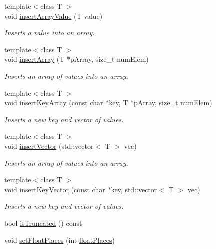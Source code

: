 \begin{DoxyCompactItemize}
{\footnotesize template$<$class T $>$ }\\void \hyperlink{class_json_writer_a8b4dc6726b66b4f277c7674e60c8a057}{insert\+Array\+Value} (T value)
\begin{DoxyCompactList}\small\item\em Inserts a value into an array. \end{DoxyCompactList}\item 
{\footnotesize template$<$class T $>$ }\\void \hyperlink{class_json_writer_a25d0c8b482f4a9a9dac6c0f339b3595f}{insert\+Array} (T $\ast$p\+Array, size\+\_\+t num\+Elem)
\begin{DoxyCompactList}\small\item\em Inserts an array of values into an array. \end{DoxyCompactList}\item 
{\footnotesize template$<$class T $>$ }\\void \hyperlink{class_json_writer_a8e0dbff82335aab801d541583fe6c48c}{insert\+Key\+Array} (const char $\ast$key, T $\ast$p\+Array, size\+\_\+t num\+Elem)
\begin{DoxyCompactList}\small\item\em Inserts a new key and vector of values. \end{DoxyCompactList}\item 
{\footnotesize template$<$class T $>$ }\\void \hyperlink{class_json_writer_a6c1f223b7ef6538ef9135fe0a8b66aab}{insert\+Vector} (std\+::vector$<$ T $>$ vec)
\begin{DoxyCompactList}\small\item\em Inserts an array of values into an array. \end{DoxyCompactList}\item 
{\footnotesize template$<$class T $>$ }\\void \hyperlink{class_json_writer_a14774145a0fa9b1328c1797f76316d82}{insert\+Key\+Vector} (const char $\ast$key, std\+::vector$<$ T $>$ vec)
\begin{DoxyCompactList}\small\item\em Inserts a new key and vector of values. \end{DoxyCompactList}\item 
bool \hyperlink{class_json_writer_a815f77b2db3315bfd40dfb61f68b0ed4}{is\+Truncated} () const
\item 
void \hyperlink{class_json_writer_aecd4d984a49fe59b0c4d892fe6d1e791}{set\+Float\+Places} (int \hyperlink{class_json_writer_ab0c979f74ad01b6e9970ffed5b39cb29}{float\+Places})

\end{DoxyCompactItemize}
